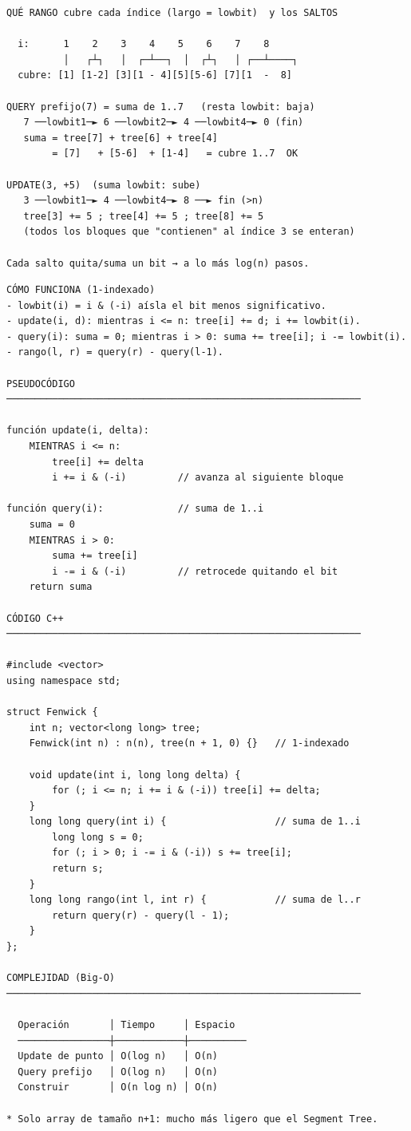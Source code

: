 \begin{dsacomofunciona}
\begin{verbatim}
QUÉ RANGO cubre cada índice (largo = lowbit)  y los SALTOS

  i:      1    2    3    4    5    6    7    8
          │   ┌┴┐   │  ┌─┴──┐  │  ┌┴┐   │ ┌──┴────┐
  cubre: [1] [1-2] [3][1 - 4][5][5-6] [7][1  -  8]

QUERY prefijo(7) = suma de 1..7   (resta lowbit: baja)
   7 ──lowbit1─► 6 ──lowbit2─► 4 ──lowbit4─► 0 (fin)
   suma = tree[7] + tree[6] + tree[4]
        = [7]   + [5-6]  + [1-4]   = cubre 1..7  OK

UPDATE(3, +5)  (suma lowbit: sube)
   3 ──lowbit1─► 4 ──lowbit4─► 8 ──► fin (>n)
   tree[3] += 5 ; tree[4] += 5 ; tree[8] += 5
   (todos los bloques que "contienen" al índice 3 se enteran)

Cada salto quita/suma un bit → a lo más log(n) pasos.
\end{verbatim}
\end{dsacomofunciona}

\begin{lstlisting}
CÓMO FUNCIONA (1-indexado)
- lowbit(i) = i & (-i) aísla el bit menos significativo.
- update(i, d): mientras i <= n: tree[i] += d; i += lowbit(i).
- query(i): suma = 0; mientras i > 0: suma += tree[i]; i -= lowbit(i).
- rango(l, r) = query(r) - query(l-1).

PSEUDOCÓDIGO
──────────────────────────────────────────────────────────────

función update(i, delta):
    MIENTRAS i <= n:
        tree[i] += delta
        i += i & (-i)         // avanza al siguiente bloque

función query(i):             // suma de 1..i
    suma = 0
    MIENTRAS i > 0:
        suma += tree[i]
        i -= i & (-i)         // retrocede quitando el bit
    return suma

CÓDIGO C++
──────────────────────────────────────────────────────────────

#include <vector>
using namespace std;

struct Fenwick {
    int n; vector<long long> tree;
    Fenwick(int n) : n(n), tree(n + 1, 0) {}   // 1-indexado

    void update(int i, long long delta) {
        for (; i <= n; i += i & (-i)) tree[i] += delta;
    }
    long long query(int i) {                   // suma de 1..i
        long long s = 0;
        for (; i > 0; i -= i & (-i)) s += tree[i];
        return s;
    }
    long long rango(int l, int r) {            // suma de l..r
        return query(r) - query(l - 1);
    }
};

COMPLEJIDAD (Big-O)
──────────────────────────────────────────────────────────────

  Operación       │ Tiempo     │ Espacio
  ────────────────┼────────────┼──────────
  Update de punto │ O(log n)   │ O(n)
  Query prefijo   │ O(log n)   │ O(n)
  Construir       │ O(n log n) │ O(n)

* Solo array de tamaño n+1: mucho más ligero que el Segment Tree.
\end{lstlisting}

